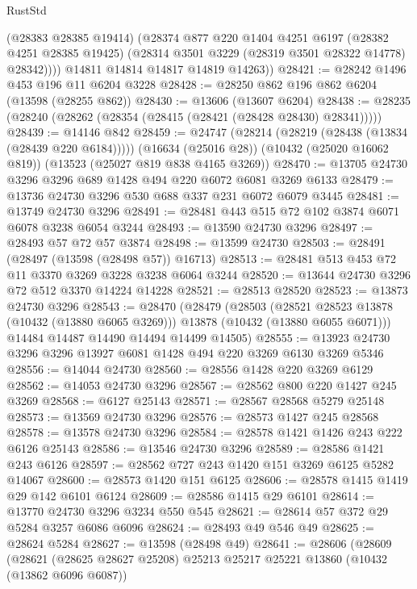 \begin{lexlean}{RustStd}
\begin{coremodule}
            (@28383 @28385 @19414)
            (@28374
              @877
              @220
              @1404
              @4251
              @6197
              (@28382 @4251 @28385 @19425)
              (@28314 @3501 @3229 (@28319 @3501 @28322 @14778) @28342))))
        @14811
        @14814
        @14817
        @14819
        @14263))
@28421 := @28242 @1496 @453 @196 @11 @6204 @3228
@28428 := @28250 @862 @196 @862 @6204 (@13598 (@28255 @862))
@28430 := @13606 (@13607 @6204)
@28438 := @28235 (@28240 (@28262 (@28354 (@28415 (@28421 (@28428 @28430) @28341)))))
@28439 := @14146 @842
@28459 := @24747
    (@28214 (@28219 (@28438 (@13834 (@28439 @220 @6184)))))
    (@16634 (@25016 @28))
    (@10432 (@25020 @16062 @819))
    (@13523 (@25027 @819 @838 @4165 @3269))
@28470 := @13705 @24730 @3296 @3296 @689 @1428 @494 @220 @6072 @6081 @3269 @6133
@28479 := @13736 @24730 @3296 @530 @688 @337 @231 @6072 @6079 @3445
@28481 := @13749 @24730 @3296
@28491 := @28481 @443 @515 @72 @102 @3874 @6071 @6078 @3238 @6054 @3244
@28493 := @13590 @24730 @3296
@28497 := @28493 @57 @72 @57 @3874
@28498 := @13599 @24730
@28503 := @28491 (@28497 (@13598 (@28498 @57)) @16713)
@28513 := @28481 @513 @453 @72 @11 @3370 @3269 @3228 @3238 @6064 @3244
@28520 := @13644 @24730 @3296 @72 @512 @3370 @14224 @14228
@28521 := @28513 @28520
@28523 := @13873 @24730 @3296
@28543 := @28470
    (@28479
      (@28503
        (@28521 @28523 @13878 (@10432 (@13880 @6065 @3269)))
        @13878
        (@10432 (@13880 @6055 @6071)))
      @14484
      @14487
      @14490
      @14494
      @14499
      @14505)
@28555 := @13923 @24730 @3296 @3296 @13927 @6081 @1428 @494 @220 @3269 @6130 @3269 @5346
@28556 := @14044 @24730
@28560 := @28556 @1428 @220 @3269 @6129
@28562 := @14053 @24730 @3296
@28567 := @28562 @800 @220 @1427 @245 @3269
@28568 := @6127 @25143
@28571 := @28567 @28568 @5279 @25148
@28573 := @13569 @24730 @3296
@28576 := @28573 @1427 @245 @28568
@28578 := @13578 @24730 @3296
@28584 := @28578 @1421 @1426 @243 @222 @6126 @25143
@28586 := @13546 @24730 @3296
@28589 := @28586 @1421 @243 @6126
@28597 := @28562 @727 @243 @1420 @151 @3269 @6125 @5282 @14067
@28600 := @28573 @1420 @151 @6125
@28606 := @28578 @1415 @1419 @29 @142 @6101 @6124
@28609 := @28586 @1415 @29 @6101
@28614 := @13770 @24730 @3296 @3234 @550 @545
@28621 := @28614 @57 @372 @29 @5284 @3257 @6086 @6096
@28624 := @28493 @49 @546 @49
@28625 := @28624 @5284
@28627 := @13598 (@28498 @49)
@28641 := @28606
    (@28609
      (@28621
        (@28625 @28627 @25208)
        @25213
        @25217
        @25221
        @13860
        (@10432 (@13862 @6096 @6087))

\end{coremodule}
\end{lexlean}
